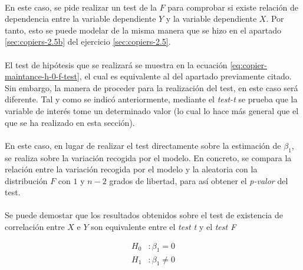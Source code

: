 \documentclass{article}
\begin{document}
        \paragraph{}
        En este caso, se pide realizar un test de la $F$ para comprobar si existe relación de dependencia entre la variable dependiente $Y$ y la variable dependiente $X$. Por tanto, esto se puede modelar de la misma manera que se hizo en el apartado \ref{sec:copiers-2.5b} del ejercicio \ref{sec:copiers-2.5}.

        \paragraph{}
        El test de hipótesis que se realizará se muestra en la ecuación \eqref{eq:copier-maintance-h-0-f-test}, el cual es equivalente al del apartado previamente citado. Sin embargo, la manera de proceder para la realización del test, en este caso será diferente. Tal y como se indicó anteriormente, mediante el \emph{test-t} se prueba que la variable de interés tome un determinado valor (lo cual lo hace más general que el que se ha realizado en esta sección).

        \paragraph{}
        En este caso, en lugar de realizar el test directamente sobre la estimación de $\beta_1$, se realiza sobre la variación recogida por el modelo. En concreto, se compara la relación entre la variación recogida por el modelo y la aleatoria con la distribución $F$ con $1$ y $n-2$ grados de libertad, para así obtener el \emph{p-valor} del test.

        \paragraph{}
        Se puede demostar que los resultados obtenidos sobre el test de existencia de correlación entre $X$ e $Y$ son equivalente entre el \emph{test t} y el \emph{test F}

        \begin{equation}
          \label{eq:copier-maintance-h-0-f-test}
          \begin{split}
            H_0&: \beta_1 = 0 \\
            H_1&: \beta_1 \neq 0
          \end{split}
        \end{equation}
\end{document}
